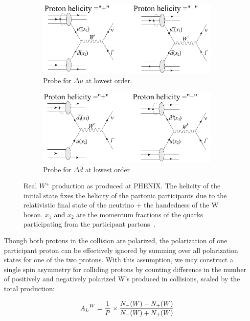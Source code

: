 \begin{figure}[ht]
  \centering
  \begin{subfigure}[b]{\textwidth}
    \centering
    \includegraphics[width=0.8\linewidth]{./figures/w_plus_u_probe.pdf}
    \caption{
      Probe for $\Delta u$ at lowest order.
    }
    \label{fig:u_probe}
  \end{subfigure}
  \begin{subfigure}[t]{\textwidth}
    \centering
    \includegraphics[width=0.8\linewidth]{./figures/w_plus_dbar_probe.pdf}
    \caption{
      Probe for $\Delta\bar{d}$ at lowest order
    }
    \label{fig:dbar_probe}
  \end{subfigure}
  \caption{
    Real $W^+$ production as produced at PHENIX. The helicity of the initial
    state fixes the helicity of the partonic participants due to the
    relativistic final state of the neutrino + the handedness of the W boson.
    $x_1$ and $x_2$ are the momentum fractions of the quarks participating from
    the participant partons~\cite{Aidala2005}. 
  }
  \label{fig:w_probe_leading_order}
\end{figure}

Though both protons in the collision are polarized, the polarization of one
participant proton can be effectively ignored by summing over all polarization
states for one of the two protons. With this assumption, we may construct a
single spin asymmetry for colliding protons by counting difference in the number
of positively and negatively polarized W's produced in collisions, scaled by the
total production:

\begin{equation}
  {{A_L}^W} =
  {{{1}\over{P}}\times{{N_{-}(W)-N_{+}(W)}\over{{N_{-}(W)+N_{+}(W)}}} }
  \label{eq:w_production_asymmetry}
\end{equation}

